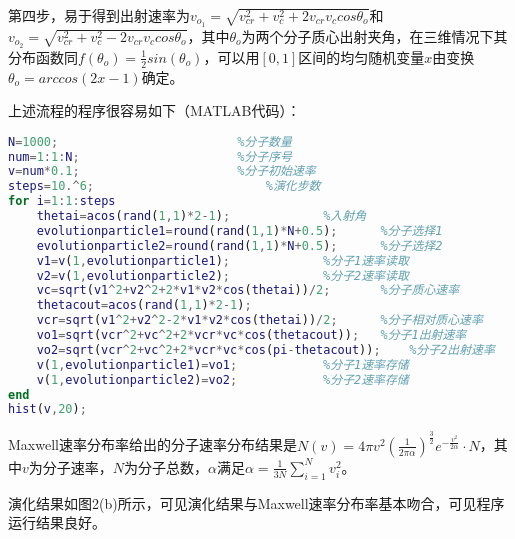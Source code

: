 \documentclass{article}
\begin{document}
第四步，易于得到出射速率为$v_{o_1}=\sqrt{v_{cr}^2+v_c^2+2v_{cr}v_ccos\theta_o}$和$v_{o_2}=\sqrt{v_{cr}^2+v_c^2-2v_{cr}v_ccos\theta_o}$，其中$\theta_o$为两个分子质心出射夹角，在三维情况下其分布函数同$f(\theta_o)=\frac{1}{2}sin(\theta_o)$，可以用$[0,1]$区间的均匀随机变量$x$由变换$\theta_o=arccos(2x-1)$确定。

上述流程的程序很容易如下（MATLAB代码）：
\begin{lstlisting}[language=MATLAB]
N=1000;							%分子数量
num=1:1:N;						%分子序号
v=num*0.1;						%分子初始速率
steps=10.^6;						%演化步数
for i=1:1:steps
    thetai=acos(rand(1,1)*2-1);				%入射角
    evolutionparticle1=round(rand(1,1)*N+0.5); 		%分子选择1
    evolutionparticle2=round(rand(1,1)*N+0.5); 		%分子选择2
    v1=v(1,evolutionparticle1);				%分子1速率读取
    v2=v(1,evolutionparticle2);				%分子2速率读取
    vc=sqrt(v1^2+v2^2+2*v1*v2*cos(thetai))/2;		%分子质心速率
    thetacout=acos(rand(1,1)*2-1);
    vcr=sqrt(v1^2+v2^2-2*v1*v2*cos(thetai))/2;		%分子相对质心速率
    vo1=sqrt(vcr^2+vc^2+2*vcr*vc*cos(thetacout));	%分子1出射速率
    vo2=sqrt(vcr^2+vc^2+2*vcr*vc*cos(pi-thetacout));	%分子2出射速率
    v(1,evolutionparticle1)=vo1;			%分子1速率存储
    v(1,evolutionparticle2)=vo2;			%分子2速率存储
end
hist(v,20);

\end{lstlisting}

Maxwell速率分布率给出的分子速率分布结果是$N(v)=4\pi v^{2}\left(\frac{1}{2\pi\alpha}\right)^{\frac{3}{2}}e^{-\frac{v^{2}}{2\alpha}}\cdot N$，其中$v$为分子速率，$N$为分子总数，$\alpha$满足$\alpha=\frac{1}{3N}\sum_{i=1}^N v_i^2$。

演化结果如图2(b)所示，可见演化结果与Maxwell速率分布率基本吻合，可见程序运行结果良好。
\end{document}
